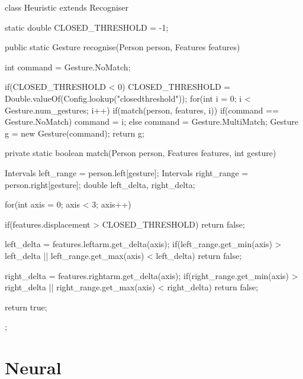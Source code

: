 \documentclass[12pt,a4,notitlepage]{report}
\renewcommand{\_}{\texttt{\symbol{95}}}
\newcommand{\<}{\texttt{\symbol{60}}}
\renewcommand{\>}{\texttt{\symbol{62}}}
\newcommand{\class}[1]{\textbf{#1}}
\begin{document}
\begin{code}
class Heuristic extends Recogniser
{
   static double CLOSED_THRESHOLD = -1;
   
   public static Gesture recognise(Person person, Features features)
   {
      int command = Gesture.NoMatch;

      if(CLOSED_THRESHOLD < 0)
         CLOSED_THRESHOLD = Double.valueOf(Config.lookup("closedthreshold"));
      for(int i = 0; i < Gesture.num_gestures; i++)
      {
         if(match(person, features, i))
         {
            if(command == Gesture.NoMatch)
               command = i;
            else
               command = Gesture.MultiMatch;
         }
      }
      Gesture g = new Gesture(command);
      return g;
   }
   
   private static boolean match(Person person, Features features, int gesture)
   {
      Intervals left_range = person.left[gesture];
      Intervals right_range = person.right[gesture];
      double left_delta, right_delta;
      
      for(int axis = 0; axis < 3; axis++)
      {
         if(features.displacement > CLOSED_THRESHOLD)
            return false;
         
         left_delta = features.leftarm.get_delta(axis);
         if(left_range.get_min(axis) > left_delta ||
               left_range.get_max(axis) < left_delta)
            return false;
         
         right_delta = features.rightarm.get_delta(axis);
         if(right_range.get_min(axis) > right_delta ||
               right_range.get_max(axis) < right_delta)
            return false;
      }
      return true;
   }
};
\end{code}

\section{\class{Neural}}
\end{document}
